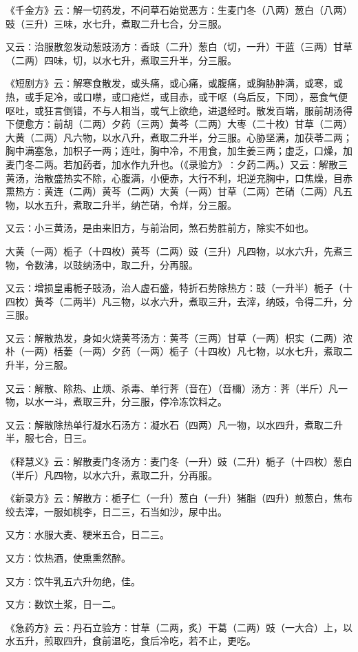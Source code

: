 \documentclass[a4paper,12pt,UTF8,twoside]{ctexbook}
\begin{document}
《千金方》云∶解一切药发，不问草石始觉恶方∶生麦门冬（八两）葱白（八两）豉（三升）三味，水七升，煮取二升七合，分三服。

又云∶治服散忽发动葱豉汤方∶香豉（二升）葱白（切，一升）干蓝（三两）甘草（二两）四味，切，以水七升，煮取三升半，分三服。

《短剧方》云∶解寒食散发，或头痛，或心痛，或腹痛，或胸胁肿满，或寒，或热，或手足冷，或口噤，或口疮烂，或目赤，或干呕（乌后反，下同），恶食气便呕吐，或狂言倒错，不与人相当，或气上欲绝，进退经时。散发百端，服前胡汤得下便愈方∶前胡（二两）夕药（三两）黄芩（二两）大枣（二十枚）甘草（二两）大黄（二两）凡六物，以水八升，煮取二升半，分三服。心胁坚满，加茯苓二两；胸中满塞急，加枳子一两；连吐，胸中冷，不用食，加生姜三两；虚乏，口燥，加麦门冬二两。若加药者，加水作九升也。（《录验方》∶夕药二两。）又云∶解散三黄汤，治散盛热实不除，心腹满，小便赤，大行不利，圯逆充胸中，口焦燥，目赤熏热方∶黄连（二两）黄芩（二两）大黄（一两）甘草（二两）芒硝（二两）凡五物，以水五升，煮取二升半，纳芒硝，令烊，分三服。

又云∶小三黄汤，是由来旧方，与前治同，煞石势胜前方，除实不如也。

大黄（一两）栀子（十四枚）黄芩（二两）豉（三升）凡四物，以水六升，先煮三物，令数沸，以豉纳汤中，取二升，分再服。

又云∶增损皇甫栀子豉汤，治人虚石盛，特折石势除热方∶豉（一升半）栀子（十四枚）黄芩（二两半）凡三物，以水六升，煮取三升，去滓，纳豉，令得二升，分三服。

又云∶解散热发，身如火烧黄芩汤方∶黄芩（三两）甘草（一两）枳实（二两）浓朴（一两）栝蒌（一两）夕药（一两）栀子（十四枚）凡七物，以水七升，煮取二升半，分三服。

又云∶解散、除热、止烦、杀毒、单行荠（音在）（音檷）汤方∶荠（半斤）凡一物，以水一斗，煮取三升，分三服，停冷冻饮料之。

又云∶解散除热单行凝水石汤方∶凝水石（四两）凡一物，以水四升，煮取二升半，服七合，日三。

《释慧义》云∶解散麦门冬汤方∶麦门冬（一升）豉（二升）栀子（十四枚）葱白（半斤）凡四物，以水六升，煮取二升，分再服。

《新录方》云∶解散方∶栀子仁（一升）葱白（一升）猪脂（四升）煎葱白，焦布绞去滓，一服如桃李，日二三，石当如沙，尿中出。

又方∶水服大麦、粳米五合，日二三。

又方∶饮热酒，使熏熏然醉。

又方∶饮牛乳五六升勿绝，佳。

又方∶数饮土浆，日一二。

《急药方》云∶丹石立验方∶甘草（二两，炙）干葛（二两）豉（一大合）上，以水五升，煎取四升，食前温吃，食后冷吃，若不止，更吃。
\end{document}
